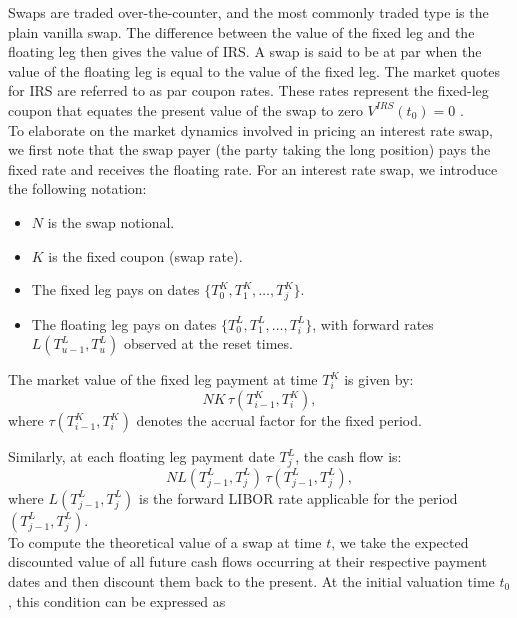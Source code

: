     \noindent
    Swaps are traded over-the-counter, and the most commonly traded type is the plain vanilla swap. The difference between the value of the fixed leg and the floating leg then gives the value of IRS. A swap is said to be at par when the value of the floating leg is equal to the value of the fixed leg. The market quotes for IRS are referred to as par coupon rates. These rates represent the fixed-leg coupon that equates the present value of the swap to zero $V^{IRS} (t_0)=0$ \cite{avsar2015logic}. \\

    \noindent
    To elaborate on the market dynamics involved in pricing an interest rate swap, we first note that the swap payer (the party taking the long position) pays the fixed rate and receives the floating rate. For an interest rate swap, we introduce the following notation:
    \begin{itemize}
        \item $N$ is the swap notional.
        \item $K$ is the fixed coupon (swap rate).
        \item The fixed leg pays on dates $\{T^K_0, T^K_1, \ldots, T^K_j\}$.
        \item The floating leg pays on dates $\{T^L_0, T^L_1, \ldots, T^L_i\}$, with forward rates $L(T^L_{u-1}, T^L_u)$ observed at the reset times.
    \end{itemize}
    \noindent
    The market value of the fixed leg payment at time $T^K_i$ is given by:
    \begin{equation}
        N K \, \tau(T^K_{i-1}, T^K_i),
    \end{equation}
    where $\tau(T^K_{i-1}, T^K_i)$ denotes the accrual factor for the fixed period.
    
    Similarly, at each floating leg payment date $T^L_j$, the cash flow is:
    \begin{equation}
        N L(T^L_{j-1}, T^L_j) \, \tau(T^L_{j-1}, T^L_j),
    \end{equation}
    where $L(T^L_{j-1}, T^L_j)$ is the forward LIBOR rate applicable for the period $(T^L_{j-1}, T^L_j)$. \\

    \noindent
    To compute the theoretical value of a swap at time $t$, we take the expected discounted value of all future cash flows occurring at their respective payment dates and then discount them back to the present. At the initial valuation time $t_0$, this condition can be expressed as
    
